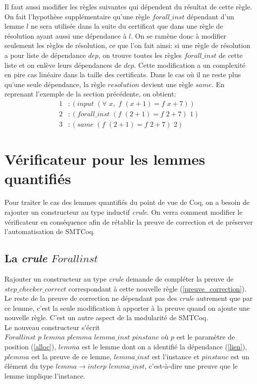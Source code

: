 \documentclass[11pt]{article}
\begin{document}
Il faut aussi modifier les règles suivantes qui dépendent du résultat de cette règle. On fait l'hypothèse supplémentaire qu'une règle $forall\_inst$ dépendant d'un lemme $l$ ne sera utilisée dans la suite du certificat que dans une règle de résolution ayant aussi une dépendance à $l$. On se ramène donc à modifier seulement les règles de résolution, ce que l'on fait ainsi: si une règle de résolution a pour liste de dépendance $dep$, on trouve toutes les règles $forall\_inst$ de cette liste et on enlève leurs dépendances de $dep$. Cette modification a un complexité en pire cas linéaire dans la taille des certificats. Dans le cas où il ne reste plus qu'une seule dépendance, la règle $resolution$ devient une règle $same$. En reprenant l'exemple de la section précédente, on obtient: 
\begin{align*}
1&:(input\,\, (\forall \,\,x, \,\, f \,\,(x+1) = f\,\,x + 7)) \\
2&:(forall\_inst \,\,(f\,\, (2+1) = f\,\,2 + 7) \,\,1) \\
3&:(same\,\, (f\,\,(2+1) = f\,\,2 + 7) \,\,2) 
\end{align*}


\section{Vérificateur pour les lemmes quantifiés} \label{instanciations}

Pour traiter le cas des lemmes quantifiés du point de vue de Coq, on a besoin de rajouter un constructeur au type inductif \textit{crule}. On verra comment modifier le vérificateur en conséquence afin de rétablir la preuve de correction et de préserver l'automatisation de SMTCoq.


\subsection{La \textit{crule} $Forallinst$}

Rajouter un constructeur au type \textit{crule} demande de compléter la preuve de  $step\_checker\_correct$ correspondant à cette nouvelle règle (\ref{preuve_correction}). Le reste de la preuve de correction ne dépendant pas des \textit{crule} autrement que par ce lemme, c'est la seule modification à apporter à la preuve quand on ajoute une nouvelle règle. C'est un autre aspect de la modularité de SMTCoq. \\

Le nouveau constructeur s'écrit $Forallinst\,\, p\,\, lemma\,\, plemma \,\,lemma\_inst \,\,pinstanc$ où $p$ est le paramètre de position (\ref{alloc}), $lemma$ est le lemme dont on a identifié la dépendance (\ref{lien}), $plemma$ est la preuve de ce lemme, $lemma\_inst$ est l'instance et $pinstanc$ est un élément du type $lemma \rightarrow interp \,\, lemma\_inst$, c'est-à-dire une preuve que le lemme implique l'instance. \\
\end{document}
